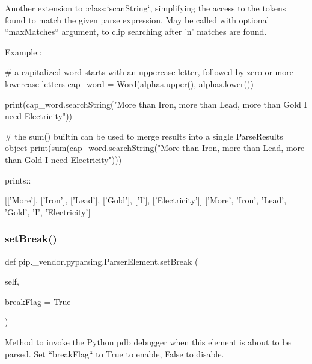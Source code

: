 \begin{DoxyVerb}Another extension to :class:`scanString`, simplifying the access to the tokens found
to match the given parse expression.  May be called with optional
``maxMatches`` argument, to clip searching after 'n' matches are found.

Example::

    # a capitalized word starts with an uppercase letter, followed by zero or more lowercase letters
    cap_word = Word(alphas.upper(), alphas.lower())

    print(cap_word.searchString("More than Iron, more than Lead, more than Gold I need Electricity"))

    # the sum() builtin can be used to merge results into a single ParseResults object
    print(sum(cap_word.searchString("More than Iron, more than Lead, more than Gold I need Electricity")))

prints::

    [['More'], ['Iron'], ['Lead'], ['Gold'], ['I'], ['Electricity']]
    ['More', 'Iron', 'Lead', 'Gold', 'I', 'Electricity']
\end{DoxyVerb}
 \mbox{\label{classpip_1_1__vendor_1_1pyparsing_1_1ParserElement_ac0f15d75e611e997f15adddd10d026ae}} 
\subsubsection{\texorpdfstring{set\+Break()}{setBreak()}}
{\footnotesize\ttfamily def pip.\+\_\+vendor.\+pyparsing.\+Parser\+Element.\+set\+Break (\begin{DoxyParamCaption}\item[{}]{self,  }\item[{}]{break\+Flag = {\ttfamily True} }\end{DoxyParamCaption})}

\begin{DoxyVerb}Method to invoke the Python pdb debugger when this element is
   about to be parsed. Set ``breakFlag`` to True to enable, False to
   disable.
\end{DoxyVerb}
 \mbox{\label{classpip_1_1__vendor_1_1pyparsing_1_1ParserElement_aa57485868018a5815428aca6c4e526b9}} 
